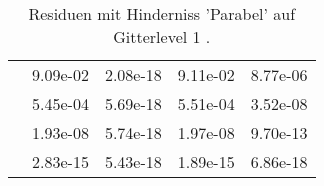 \begin{table}
\begin{tabular}{c|cc|cc|}
\multicolumn{1}{|c|}{} & \multicolumn{1}{|c|}{  9.09e-02} & \multicolumn{1}{|c|}{  2.08e-18} & \multicolumn{1}{|c|}{  9.11e-02} & \multicolumn{1}{|c|}{  8.77e-06} \\ 
\multicolumn{1}{|c|}{} & \multicolumn{1}{|c|}{  5.45e-04} & \multicolumn{1}{|c|}{  5.69e-18} & \multicolumn{1}{|c|}{  5.51e-04} & \multicolumn{1}{|c|}{  3.52e-08} \\ 
\multicolumn{1}{|c|}{} & \multicolumn{1}{|c|}{  1.93e-08} & \multicolumn{1}{|c|}{  5.74e-18} & \multicolumn{1}{|c|}{  1.97e-08} & \multicolumn{1}{|c|}{  9.70e-13} \\ 
\multicolumn{1}{|c|}{} & \multicolumn{1}{|c|}{  2.83e-15} & \multicolumn{1}{|c|}{  5.43e-18} & \multicolumn{1}{|c|}{  1.89e-15} & \multicolumn{1}{|c|}{  6.86e-18} \\ 
\hline 
\end{tabular}\caption{Residuen mit Hinderniss 'Parabel' auf Gitterlevel 1 .}\label{tab:Residuum_Parabel_level1}
\end{table} 
